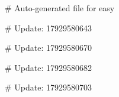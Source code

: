 # Auto-generated file for easy

# Update: 17929580643

# Update: 17929580670

# Update: 17929580682

# Update: 17929580703
